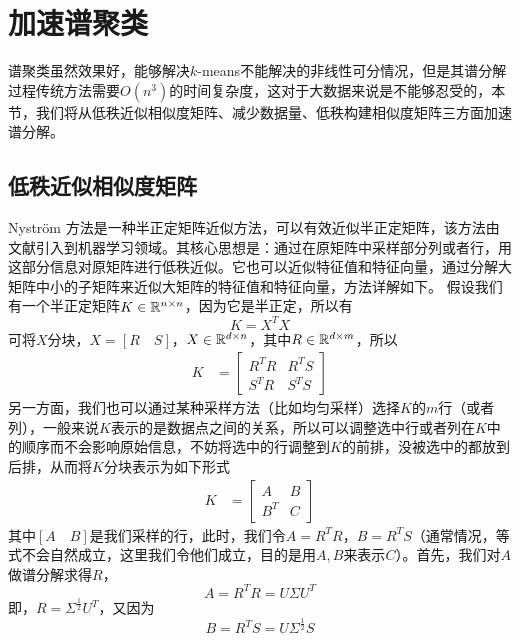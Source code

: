 \section{加速谱聚类}
谱聚类虽然效果好，能够解决$k$-means不能解决的非线性可分情况，但是其谱分解过程传统方法需要$O(n^3)$的时间复杂度，这对于大数据来说是不能够忍受的，本节，我们将从低秩近似相似度矩阵、减少数据量、低秩构建相似度矩阵三方面加速谱分解。
\subsection{低秩近似相似度矩阵}
Nyström 方法是一种半正定矩阵近似方法，可以有效近似半正定矩阵，该方法由文献\cite{williams2001using}引入到机器学习领域。其核心思想是：通过在原矩阵中采样部分列或者行，用这部分信息对原矩阵进行低秩近似。它也可以近似特征值和特征向量，通过分解大矩阵中小的子矩阵来近似大矩阵的特征值和特征向量，方法详解如下。
假设我们有一个半正定矩阵$K \in \mathbb{R}^{n \times n}$，因为它是半正定，所以有
\begin{equation*}
    K = X^T X
\end{equation*}
可将$X$分块，$X=[R\quad S]$，$X \in \mathbb{R}^{d\times n}$，其中$R \in \mathbb{R}^{d\times m}$，所以
\begin{align*}
    K & = \begin{bmatrix}
            R^T R & R^T S \\
            S^T R & S^T S 
          \end{bmatrix} 
\end{align*}
另一方面，我们也可以通过某种采样方法（比如均匀采样）选择$K$的$m$行（或者列），一般来说$K$表示的是数据点之间的关系，所以可以调整选中行或者列在$K$中的顺序而不会影响原始信息，不妨将选中的行调整到$K$的前排，没被选中的都放到后排，从而将$K$分块表示为如下形式
\begin{align*}
    K & = \begin{bmatrix}
            A & B \\
            B^T & C
          \end{bmatrix} 
\end{align*}
其中$[A \quad B]$是我们采样的行，此时，我们令$A = R^T R$，$B = R^T S$（通常情况，等式不会自然成立，这里我们令他们成立，目的是用$A,B$来表示$C$）。首先，我们对$A$做谱分解求得$R$，
\begin{equation*}
    A = R^T R = U\Sigma U^T
\end{equation*}
即，$R = \Sigma^{\frac{1}{2}}U^T$，又因为
\begin{equation*}
    B = R^T S = U\Sigma^{\frac{1}{2}}S
\end{equation*}
